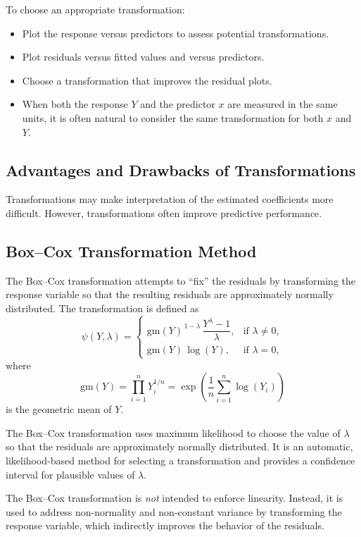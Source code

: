 To choose an appropriate transformation:
\begin{itemize}
  \item Plot the response versus predictors to assess potential transformations.
  \item Plot residuals versus fitted values and versus predictors.
  \item Choose a transformation that improves the residual plots.
  \item When both the response $Y$ and the predictor $x$ are measured in the same units, it is often natural to consider the same transformation for both $x$ and $Y$.
\end{itemize}

\subsection{Advantages and Drawbacks of Transformations}

Transformations may make interpretation of the estimated coefficients more difficult. However, transformations often improve predictive performance.

\subsection{Box--Cox Transformation Method}

The Box--Cox transformation attempts to ``fix'' the residuals by transforming the response variable so that the resulting residuals are approximately normally distributed. The transformation is defined as
\[
\psi(Y,\lambda)=
\begin{cases}
\mathrm{gm}(Y)^{\,1-\lambda}\,\dfrac{Y^{\lambda}-1}{\lambda}, & \text{if } \lambda \neq 0, \\[1em]
\mathrm{gm}(Y)\,\log(Y), & \text{if } \lambda = 0,
\end{cases}
\]
where
\[
\mathrm{gm}(Y)
= \prod_{i=1}^{n} Y_i^{1/n}
= \exp\!\left(\frac{1}{n}\sum_{i=1}^{n}\log(Y_i)\right)
\]
is the geometric mean of $Y$.

The Box--Cox transformation uses maximum likelihood to choose the value of $\lambda$ so that the residuals are approximately normally distributed. It is an automatic, likelihood-based method for selecting a transformation and provides a confidence interval for plausible values of $\lambda$.

The Box--Cox transformation is \emph{not} intended to enforce linearity. Instead, it is used to address non-normality and non-constant variance by transforming the response variable, which indirectly improves the behavior of the residuals.

